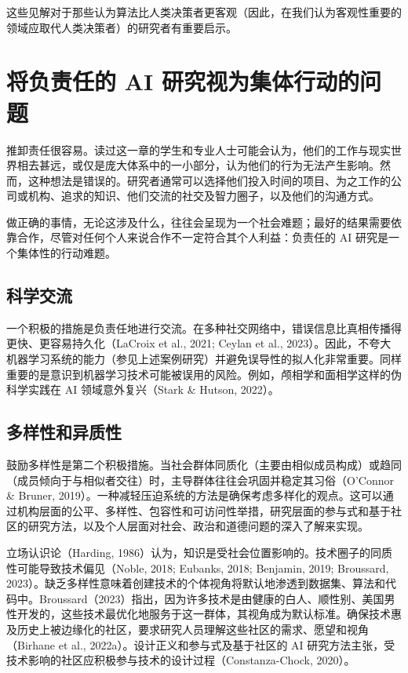 \documentclass[lang=cn,newtx,10pt,scheme=chinese]{elegantbook}
\begin{document}
这些见解对于那些认为算法比人类决策者更客观（因此，在我们认为客观性重要的领域应取代人类决策者）的研究者有重要启示。


\section{将负责任的 AI 研究视为集体行动的问题}
推卸责任很容易。读过这一章的学生和专业人士可能会认为，他们的工作与现实世界相去甚远，或仅是庞大体系中的一小部分，认为他们的行为无法产生影响。然而，这种想法是错误的。研究者通常可以选择他们投入时间的项目、为之工作的公司或机构、追求的知识、他们交流的社交及智力圈子，以及他们的沟通方式。

做正确的事情，无论这涉及什么，往往会呈现为一个社会难题；最好的结果需要依靠合作，尽管对任何个人来说合作不一定符合其个人利益：负责任的 AI 研究是一个集体性的行动难题。

\subsection{科学交流}
一个积极的措施是负责任地进行交流。在多种社交网络中，错误信息比真相传播得更快、更容易持久化（LaCroix et al., 2021; Ceylan et al., 2023）。因此，不夸大机器学习系统的能力（参见上述案例研究）并避免误导性的拟人化非常重要。同样重要的是意识到机器学习技术可能被误用的风险。例如，颅相学和面相学这样的伪科学实践在 AI 领域意外复兴（Stark \& Hutson, 2022）。

\subsection{多样性和异质性}
鼓励多样性是第二个积极措施。当社会群体同质化（主要由相似成员构成）或趋同（成员倾向于与相似者交往）时，主导群体往往会巩固并稳定其习俗（O’Connor \& Bruner, 2019）。一种减轻压迫系统的方法是确保考虑多样化的观点。这可以通过机构层面的公平、多样性、包容性和可访问性举措，研究层面的参与式和基于社区的研究方法，以及个人层面对社会、政治和道德问题的深入了解来实现。

立场认识论（Harding, 1986）认为，知识是受社会位置影响的。技术圈子的同质性可能导致技术偏见（Noble, 2018; Eubanks, 2018; Benjamin, 2019; Broussard, 2023）。缺乏多样性意味着创建技术的个体视角将默认地渗透到数据集、算法和代码中。Broussard（2023）指出，因为许多技术是由健康的白人、顺性别、美国男性开发的，这些技术最优化地服务于这一群体，其视角成为默认标准。确保技术惠及历史上被边缘化的社区，要求研究人员理解这些社区的需求、愿望和视角（Birhane et al., 2022a）。设计正义和参与式及基于社区的 AI 研究方法主张，受技术影响的社区应积极参与技术的设计过程（Constanza-Chock, 2020）。
\end{document}
